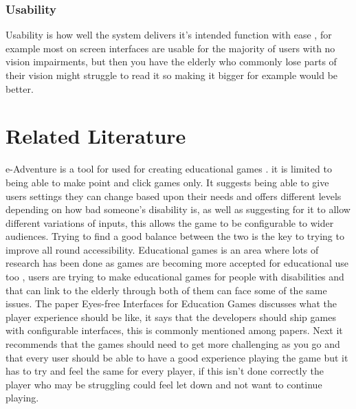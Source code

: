 \documentclass[journal]{IEEEtran}
\begin{document}
\subsubsection{Usability} Usability is how well the system delivers it's intended function with ease \cite{hersh_accessibility_2012}, for example most on screen interfaces are usable for the majority of users with no vision impairments, but then you have the elderly who commonly lose parts of their vision \cite{correia_global_2016} might struggle to read it so making it bigger for example would be better.

\section{Related Literature}
e-Adventure is a tool for used for creating educational games \cite{torrente_introducing_2011}. it is limited to being able to make point and click games only. It suggests being able to give users settings they can change based upon their needs and offers different levels depending on how bad someone's disability is, as well as suggesting for it to allow different variations of inputs, this allows the game to be configurable to wider audiences. Trying to find a good balance between the two is the key to trying to improve all round accessibility. 
\newline
Educational games is an area  where lots of research has been done as games are becoming more accepted for educational use too \cite{torrente_eyes-free_2012}, users are trying to make educational games for people with disabilities and that can link to the elderly through both of them can face some of the same issues. The paper Eyes-free Interfaces for Education Games \cite{torrente_eyes-free_2012} discusses what the player experience should be like, it says that the developers should ship games with configurable interfaces, this is commonly mentioned among papers. Next it recommends that the games should need to get more challenging as you go and that every user should be able to have a good experience playing the game but it has to try and feel the same for every player, if this isn't done correctly the player who may be struggling could feel let down and not want to continue playing.
\newline
\end{document}
